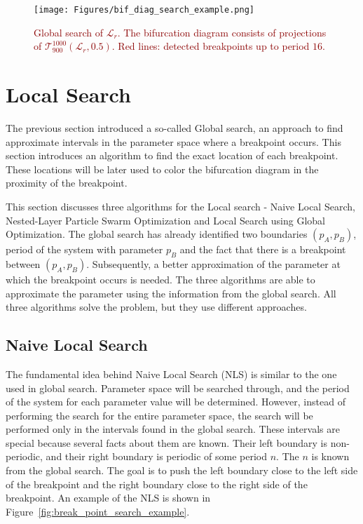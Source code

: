 \begin{figure}[!h]
    \centering
    \texttt{[image: Figures/bif\_diag\_search\_example.png]}
    \caption{
        \textcolor{darkred}{
        Global search of $\mathcal{L}_{r}$.
        The bifurcation diagram consists of projections of $\mathcal{T}_{900}^{1000}(\mathcal{L}_{r}, 0.5)$.
        Red lines: detected breakpoints up to period $16$.
        }
    }
    \label{fig:bif_diag_search_example}
\end{figure}

\section{Local Search}
The previous section introduced a so-called Global search, an approach to find approximate intervals in the parameter space where a breakpoint occurs.
This section introduces an algorithm to find the exact location of each breakpoint.
These locations will be later used to color the bifurcation diagram in the proximity of the breakpoint.
\par
This section discusses three algorithms for the Local search - Naive Local Search, Nested-Layer Particle Swarm Optimization and Local Search using Global Optimization.
The global search has already identified two boundaries $(p_A, p_B)$, period of the system with parameter $p_B$ and the fact that there is a breakpoint between $(p_A, p_B)$.
Subsequently, a better approximation of the parameter at which the breakpoint occurs is needed.
The three algorithms are able to approximate the parameter using the information from the global search.
All three algorithms solve the problem, but they use different approaches.

\subsection{Naive Local Search}
\label{subsec:naive_local_search}
The fundamental idea behind Naive Local Search (NLS) is similar to the one used in global search.
Parameter space will be searched through, and the period of the system for each parameter value will be determined.
However, instead of performing the search for the entire parameter space, the search will be performed only in the intervals found in the global search.
These intervals are special because several facts about them are known.
Their left boundary is non-periodic, and their right boundary is periodic of some period $n$.
The $n$ is known from the global search.
The goal is to push the left boundary close to the left side of the breakpoint and the right boundary close to the right side of the breakpoint.
An example of the NLS is shown in Figure~\ref{fig:break_point_search_example}.


